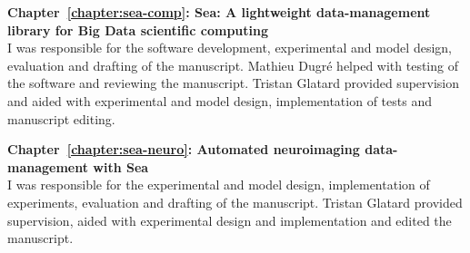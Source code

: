 \begin{contributions}
	\textbf{Chapter~\ref{chapter:sea-comp}: Sea: A lightweight data-management library for Big Data scientific
computing}\\
	I was responsible for the software development, experimental and model design, evaluation and drafting of the manuscript.
	Mathieu Dugr\'e helped with testing of the software and reviewing the manuscript.
	Tristan Glatard provided supervision and aided with experimental and model design, implementation of tests and manuscript editing.


	\textbf{Chapter~\ref{chapter:sea-neuro}: Automated neuroimaging data-management with Sea}\\
	I was responsible for the experimental and model design, implementation of experiments, evaluation and drafting of the manuscript.
	Tristan Glatard provided supervision, aided with experimental design and implementation and edited the manuscript.






\end{contributions}
